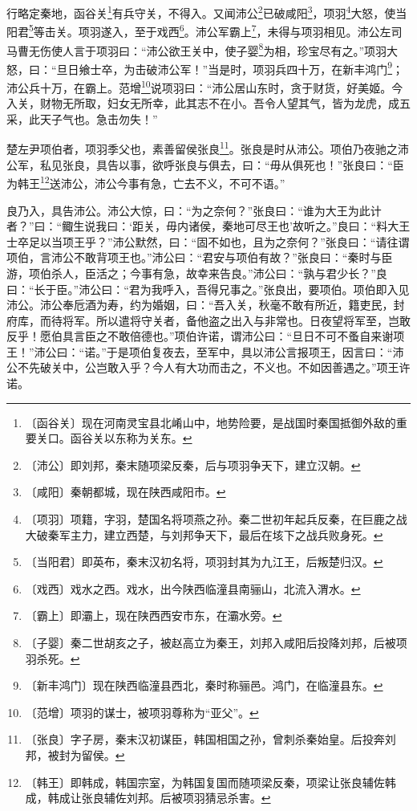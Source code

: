 \documentclass[12pt,UTF-8,openany]{ctexbook}
\begin{document}
\begin{normalsize}
    
    行略定秦地，函谷关\footnote{〔函谷关〕现在河南灵宝县北崤山中，地势险要，是战国时秦国抵御外敌的重要关口。函谷关以东称为关东。}有兵守关，不得入。又闻沛公\footnote{〔沛公〕即刘邦，秦末随项梁反秦，后与项羽争天下，建立汉朝。}已破咸阳\footnote{〔咸阳〕秦朝都城，现在陕西咸阳市。}，项羽\footnote{〔项羽〕项籍，字羽，楚国名将项燕之孙。秦二世初年起兵反秦，在巨鹿之战大破秦军主力，建立西楚，与刘邦争天下，最后在垓下之战兵败身死。}大怒，使当阳君\footnote{〔当阳君〕即英布，秦末汉初名将，项羽封其为九江王，后叛楚归汉。}等击关。项羽遂入，至于戏西\footnote{〔戏西〕戏水之西。戏水，出今陕西临潼县南骊山，北流入渭水。}。沛公军霸上\footnote{〔霸上〕即灞上，现在陕西西安市东，在灞水旁。}，未得与项羽相见。沛公左司马曹无伤使人言于项羽曰：“沛公欲王关中，使子婴\footnote{〔子婴〕秦二世胡亥之子，被赵高立为秦王，刘邦入咸阳后投降刘邦，后被项羽杀死。}为相，珍宝尽有之。”项羽大怒，曰：“旦日飨士卒，为击破沛公军！”当是时，项羽兵四十万，在新丰鸿门\footnote{〔新丰鸿门〕现在陕西临潼县西北，秦时称骊邑。鸿门，在临潼县东。}；沛公兵十万，在霸上。范增\footnote{〔范增〕项羽的谋士，被项羽尊称为“亚父”。}说项羽曰：“沛公居山东时，贪于财货，好美姬。今入关，财物无所取，妇女无所幸，此其志不在小。吾令人望其气，皆为龙虎，成五采，此天子气也。急击勿失！”
    
    楚左尹项伯者，项羽季父也，素善留侯张良\footnote{〔张良〕字子房，秦末汉初谋臣，韩国相国之孙，曾刺杀秦始皇。后投奔刘邦，被封为留侯。}。张良是时从沛公。项伯乃夜驰之沛公军，私见张良，具告以事，欲呼张良与俱去，曰：“毋从俱死也！”张良曰：“臣为韩王\footnote{〔韩王〕即韩成，韩国宗室，为韩国复国而随项梁反秦，项梁让张良辅佐韩成，韩成让张良辅佐刘邦。后被项羽猜忌杀害。}送沛公，沛公今事有急，亡去不义，不可不语。”
    
    良乃入，具告沛公。沛公大惊，曰：“为之奈何？”张良曰：“谁为大王为此计者？”曰：“鲰生说我曰：‘距关，毋内诸侯，秦地可尽王也’故听之。”良曰：“料大王士卒足以当项王乎？”沛公默然，曰：“固不如也，且为之奈何？”张良曰：“请往谓项伯，言沛公不敢背项王也。”沛公曰：“君安与项伯有故？”张良曰：“秦时与臣游，项伯杀人，臣活之；今事有急，故幸来告良。”沛公曰：“孰与君少长？”良曰：“长于臣。”沛公曰：“君为我呼入，吾得兄事之。”张良出，要项伯。项伯即入见沛公。沛公奉卮酒为寿，约为婚姻，曰：“吾入关，秋毫不敢有所近，籍吏民，封府库，而待将军。所以遣将守关者，备他盗之出入与非常也。日夜望将军至，岂敢反乎！愿伯具言臣之不敢倍德也。”项伯许诺，谓沛公曰：“旦日不可不蚤自来谢项王！”沛公曰：“诺。”于是项伯复夜去，至军中，具以沛公言报项王，因言曰：“沛公不先破关中，公岂敢入乎？今人有大功而击之，不义也。不如因善遇之。”项王许诺。
    

\end{normalsize}
\end{document}
